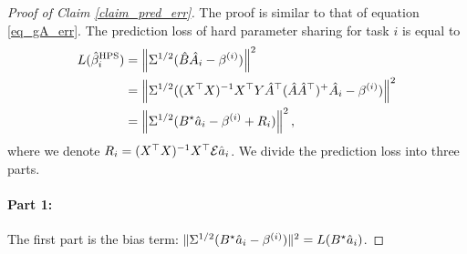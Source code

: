	\begin{proof}[Proof of Claim \ref{claim_pred_err}]
	The proof is similar to that of equation \eqref{eq_gA_err}.
	The prediction loss of hard parameter sharing for task $i$ is equal to
	\begin{align*}
		L(\hat{\beta}_i^{\textup{HPS}}) &= \left\| \Sigma^{1/2} (\hat{B} \hat{A}_i - \beta^{(i)}) \right\|^2 \\
		&= \left\| \Sigma^{1/2} ((X^{\top} X)^{-1} X^{\top} Y \hat{A}^{\top} (\hat{A} \hat{A}^{\top})^{+} \hat{A}_i - \beta^{(i)}) \right\|^2 \\
		&= \left\| \Sigma^{1/2} (B^{\star} \hat{a}_i - \beta^{(i)} + R_i) \right\|^2,
	\end{align*}
	where we denote $R_i = (X^{\top} X)^{-1} X^{\top} \mathcal{E} \hat{a}_i$.
	We divide the prediction loss into three parts.

	\paragraph{Part 1:} The first part is the bias term:
	$\|\Sigma^{1/2} (B^{\star} \hat{a}_i - \beta^{(i)})\|^2 = L(B^{\star} \hat{a}_i)$.


\end{proof}
